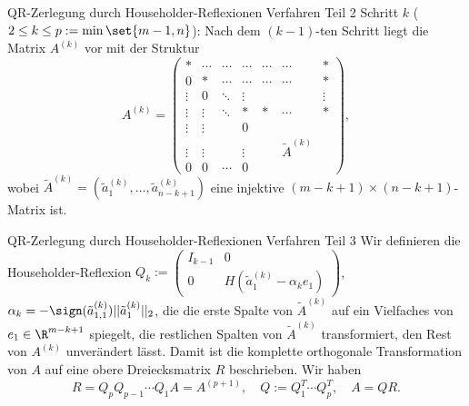 \begin{karte}{QR-Zerlegung durch Householder-Reflexionen Verfahren Teil 2}
    Schritt \(k\) (\( 2 \leq k \leq p := \min\set{m-1, n} \)): 
    Nach dem \( (k-1) \)-ten Schritt liegt die Matrix 
    \( A^{(k)} \) vor mit der Struktur 
    \[ A^{(k)} = \left( \begin{array}{ccccccc}
        \ast & \cdots & \cdots & \cdots & \cdots & \cdots & \ast \\
        0 & \ast & \cdots & \cdots & \cdots & \cdots & \ast \\
        \vdots & 0 & \ddots & \vdots & & & \vdots \\
        \vdots & \vdots & \ddots & \ast & \ast & \cdots & \ast \\
        \vdots & \vdots & & 0 & & & \\
        \vdots & \vdots & & \vdots & & \tilde{A}^{(k)} & \\
        0 & 0 & \cdots & 0 & & &
    \end{array}\right), \]
    wobei \( \tilde{A}^{(k)} = (\tilde{a}_1^{(k)}, \ldots, \tilde{a}_{n-k+1}^{(k)}) \) 
    eine injektive \( (m-k+1)\times (n-k+1) \)-Matrix ist.
\end{karte}

\begin{karte}{QR-Zerlegung durch Householder-Reflexionen Verfahren Teil 3}
    Wir definieren die Householder-Reflexion \( Q_k := \left( \begin{array}{c|c}
        I_{k-1} & 0 \\
        \hline 
        0 & H(\tilde{a}_1^{(k)} - \alpha_k e_1)
    \end{array} \right) \), 
    \(\alpha_k = - \sign(\tilde{a}_{1,1}^{(k)}) ||\tilde{a}_1^{(k)}||_2 \), 
    die die erste Spalte von \( \tilde{A}^{(k)} \) auf ein Vielfaches von 
    \( e_1 \in \R^{m-k+1} \) spiegelt, die restlichen Spalten von \( \tilde{A}^{(k)} \) 
    transformiert, den Rest von \( A^{(k)} \) unverändert lässt.
    Damit ist die komplette orthogonale Transformation von \( A \) auf eine obere Dreiecksmatrix 
    \(R\) beschrieben. Wir haben 
    \[ R = Q_p Q_{p-1} \cdots Q_1 A = A^{(p+1)}, \quad Q := Q_1^T \cdots Q_p^T, \quad A = QR. \]
\end{karte}

